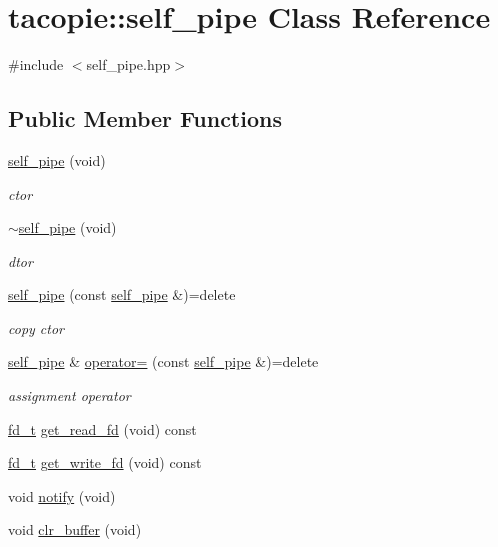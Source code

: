 \hypertarget{classtacopie_1_1self__pipe}{}\section{tacopie\+:\+:self\+\_\+pipe Class Reference}
\label{classtacopie_1_1self__pipe}


{\ttfamily \#include $<$self\+\_\+pipe.\+hpp$>$}

\subsection*{Public Member Functions}
\begin{DoxyCompactItemize}
\item 
\hyperlink{classtacopie_1_1self__pipe_add8d2c43863d1505e6851789ab5d9b97}{self\+\_\+pipe} (void)
\begin{DoxyCompactList}\small\item\em ctor \end{DoxyCompactList}\item 
\hyperlink{classtacopie_1_1self__pipe_a10a6c4b0d67a4a14abea397a05cee54c}{$\sim$self\+\_\+pipe} (void)
\begin{DoxyCompactList}\small\item\em dtor \end{DoxyCompactList}\item 
\hyperlink{classtacopie_1_1self__pipe_a09ffc77b89ad48bc8db6635108c68b6b}{self\+\_\+pipe} (const \hyperlink{classtacopie_1_1self__pipe}{self\+\_\+pipe} \&)=delete
\begin{DoxyCompactList}\small\item\em copy ctor \end{DoxyCompactList}\item 
\hyperlink{classtacopie_1_1self__pipe}{self\+\_\+pipe} \& \hyperlink{classtacopie_1_1self__pipe_a14e0fa3a880b6c9559c087eac480c518}{operator=} (const \hyperlink{classtacopie_1_1self__pipe}{self\+\_\+pipe} \&)=delete
\begin{DoxyCompactList}\small\item\em assignment operator \end{DoxyCompactList}\item 
\hyperlink{namespacetacopie_acce7ad26b2d30156b1e6fa353f727026}{fd\+\_\+t} \hyperlink{classtacopie_1_1self__pipe_a301b416f5f8236a383065b381385b88c}{get\+\_\+read\+\_\+fd} (void) const
\item 
\hyperlink{namespacetacopie_acce7ad26b2d30156b1e6fa353f727026}{fd\+\_\+t} \hyperlink{classtacopie_1_1self__pipe_ab36a4deb45bb408988f26315aedc0d74}{get\+\_\+write\+\_\+fd} (void) const
\item 
void \hyperlink{classtacopie_1_1self__pipe_ade9e0e3d19b8d4d22977935a578d508e}{notify} (void)
\item 
void \hyperlink{classtacopie_1_1self__pipe_a4f55a34bd882d59bdcc73b87222ba3d8}{clr\+\_\+buffer} (void)
\end{DoxyCompactItemize}
